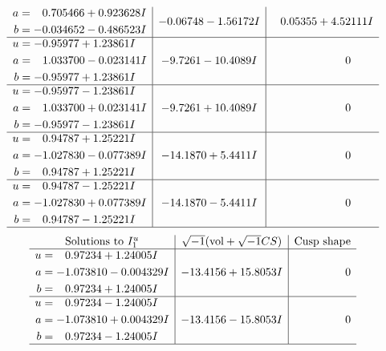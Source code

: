 \documentclass[1p]{elsarticle_modified}
\theoremstyle{definition}
\newcommand{\I}{\sqrt{-1}}
\begin{document}
$$\begin{array}{c|c|c}
\begin{aligned}
a &= \phantom{-}0.705466 + 0.923628 I \\
b &= -0.034652 - 0.486523 I\end{aligned}
 & -0.06748 - 1.56172 I & \phantom{-}0.05355 + 4.52111 I \\ \hline\begin{aligned}
u &= -0.95977 + 1.23861 I \\
a &= \phantom{-}1.033700 - 0.023141 I \\
b &= -0.95977 + 1.23861 I\end{aligned}
 & -9.7261 - 10.4089 I & \phantom{-0.000000 } 0 \\ \hline\begin{aligned}
u &= -0.95977 - 1.23861 I \\
a &= \phantom{-}1.033700 + 0.023141 I \\
b &= -0.95977 - 1.23861 I\end{aligned}
 & -9.7261 + 10.4089 I & \phantom{-0.000000 } 0 \\ \hline\begin{aligned}
u &= \phantom{-}0.94787 + 1.25221 I \\
a &= -1.027830 - 0.077389 I \\
b &= \phantom{-}0.94787 + 1.25221 I\end{aligned}
 & -14.1870 + 5.4411 I & \phantom{-0.000000 } 0 \\ \hline\begin{aligned}
u &= \phantom{-}0.94787 - 1.25221 I \\
a &= -1.027830 + 0.077389 I \\
b &= \phantom{-}0.94787 - 1.25221 I\end{aligned}
 & -14.1870 - 5.4411 I & \phantom{-0.000000 } 0\\
 \hline 
 \end{array}$$\newpage$$\begin{array}{c|c|c}  
\text{Solutions to }I^u_{1}& \I (\text{vol} + \sqrt{-1}CS) & \text{Cusp shape}\\
 \hline 
\begin{aligned}
u &= \phantom{-}0.97234 + 1.24005 I \\
a &= -1.073810 - 0.004329 I \\
b &= \phantom{-}0.97234 + 1.24005 I\end{aligned}
 & -13.4156 + 15.8053 I & \phantom{-0.000000 } 0 \\ \hline\begin{aligned}
u &= \phantom{-}0.97234 - 1.24005 I \\
a &= -1.073810 + 0.004329 I \\
b &= \phantom{-}0.97234 - 1.24005 I\end{aligned}
 & -13.4156 - 15.8053 I & \phantom{-0.000000 } 0\\
 \hline 
 \end{array}$$\newpage\newpage\renewcommand{\arraystretch}{1}
\end{document}
